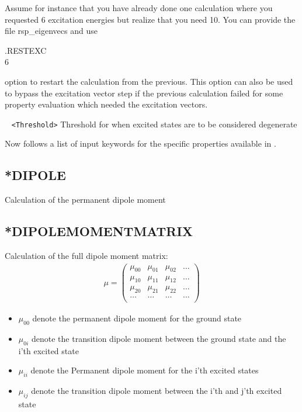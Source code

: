 \begin{description}
Assume for instance that you have already done one calculation where you requested 6 excitation 
energies but realize that you need 10. You can provide the file rsp\_eigenvecs and use

.RESTEXC\\
6 

option to restart the calculation from the previous. 
This option can also be used to bypass the excitation vector step if the previous calculation failed for some property evaluation which needed the excitation vectors.  
\item[\Key{DTHR}] \verb| | \newline
\verb|<Threshold>|\newline 
Threshold for when excited states are to be considered degenerate
\end{description}
Now follows a list of input keywords for the specific properties
available in \lsdalton.

\subsection{*DIPOLE}\label{subsec:dipole}
Calculation of the permanent dipole moment

\subsection{*DIPOLEMOMENTMATRIX}\label{subsec:dipolematrix}
Calculation of the full dipole moment matrix:\newline
\begin{eqnarray}
\mu = \left(\begin{array}{cccc}
\mu_{00} & \mu_{01} & \mu_{02} & \dots \\
\mu_{10} & \mu_{11} & \mu_{12} & \dots \\
\mu_{20} & \mu_{21} & \mu_{22} & \dots \\
\dots & \dots & \dots & \dots \\
\end{array}\right)
\end{eqnarray}
\begin{itemize}
\item $\mu_{00}$ denote the permanent dipole moment for the ground state
\item $\mu_{0i}$ denote the transition dipole moment between the ground state and the i'th excited state
\item $\mu_{ii}$ denote the Permanent dipole moment for the i'th excited states
\item $\mu_{ij}$ denote the transition dipole moment between the i'th and j'th excited state
\end{itemize}

